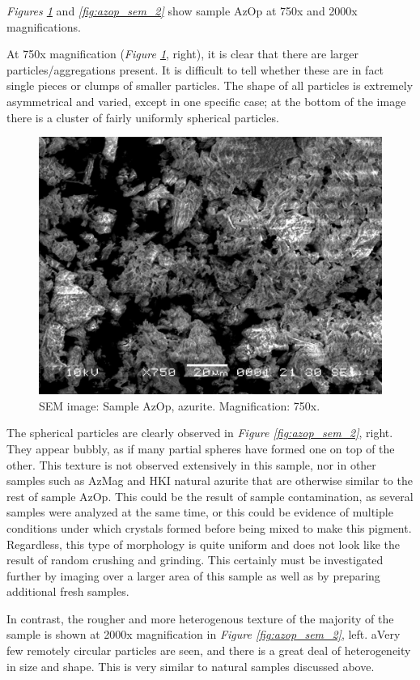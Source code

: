 
\textit{Figures \ref{fig:azop_sem_1}} and \textit{\ref{fig:azop_sem_2}} show sample AzOp at 750x and 2000x magnifications. 

At 750x magnification (\textit{Figure \ref{fig:azop_sem_1}}, right), it is clear that there are larger particles/aggregations present. It is difficult to tell whether these are in fact single pieces or clumps of smaller particles. The shape of all particles is extremely asymmetrical and varied, except in one specific case; at the bottom of the image there is a cluster of fairly uniformly spherical particles. 

\begin{figure}[H]
\centering
  \includegraphics[width=.45\linewidth]{AzOp_x750_2_150321}
\caption[SEM image: Sample AzOp, azurite]{SEM image: Sample AzOp, azurite. Magnification: 750x.}
\label{fig:azop_sem_1}
\end{figure}

The spherical particles are clearly observed in \textit{Figure \ref{fig:azop_sem_2}}, right. They appear bubbly, as if many partial spheres have formed one on top of the other. This texture is not observed extensively in this sample, nor in other samples such as AzMag and HKI natural azurite that are otherwise similar to the rest of sample AzOp. This could be the result of sample contamination, as several samples were analyzed at the same time, or this could be evidence of multiple conditions under which crystals formed before being mixed to make this pigment. Regardless, this type of morphology is quite uniform and does not look like the result of random crushing and grinding. This certainly must be investigated further by imaging over a larger area of this sample as well as by preparing additional fresh samples.

In contrast, the rougher and more heterogenous texture of the majority of the sample is shown at 2000x magnification in \textit{Figure \ref{fig:azop_sem_2}}, left. aVery few remotely circular particles are seen, and there is a great deal of heterogeneity in size and shape. This is very similar to natural samples discussed above.

